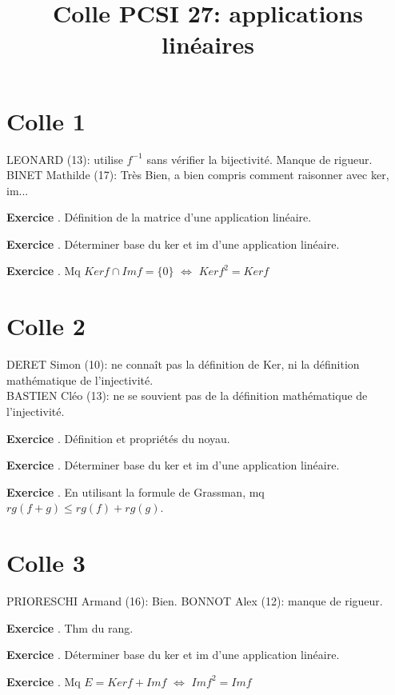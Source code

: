 \documentclass[10pt,a4paper]{article}
\title{Colle PCSI 27: applications linéaires}
\newcounter{question}
\newcounter{exo}
\newenvironment{exo}{\vspace{0.5cm}\setcounter{question}{0}\addtocounter{exo}{1} \noindent \textbf{Exercice \theexo}. \normalsize }{\par}
\begin{document}
	\maketitle
	
	\section*{Colle 1}

	\setcounter{exo}{0}
	LEONARD (13): utilise $f^{-1}$ sans vérifier la bijectivité. Manque de rigueur.
	BINET Mathilde (17): Très Bien, a bien compris comment raisonner avec ker, im...\\
	
	\begin{exo}
		Définition de la matrice d'une application linéaire.
	\end{exo}

	\begin{exo}
		Déterminer base du ker et im d'une application linéaire.
	\end{exo}	

	\begin{exo}
		Mq $Ker f \cap Im f = \lbrace 0 \rbrace$ $\Longleftrightarrow$ $Ker f^2 = Ker f$
	\end{exo}
	
	\section*{Colle 2}

	\setcounter{exo}{0}
	DERET Simon (10): ne connaît pas la définition de Ker, ni la définition mathématique de l'injectivité.\\
	BASTIEN Cléo (13): ne se souvient pas de la définition mathématique de l'injectivité.\\
	
	\begin{exo}
		Définition et propriétés du noyau.
	\end{exo}
		
	\begin{exo}
		Déterminer base du ker et im d'une application linéaire.		
	\end{exo}	
	
	\begin{exo}
		En utilisant la formule de Grassman, mq $rg(f + g) \leq rg(f) + rg(g)$.		
	\end{exo}
	
	\section*{Colle 3}
	\setcounter{exo}{0}
	PRIORESCHI Armand (16): Bien.
	BONNOT Alex (12): manque de rigueur.\\
	
	\begin{exo}
		Thm du rang.
	\end{exo}

	\begin{exo}
		Déterminer base du ker et im d'une application linéaire.
	\end{exo}	

	\begin{exo}
		Mq $E = Ker f + Im f$ $\Longleftrightarrow$ $Im f^2 = Im f$
	\end{exo}
\end{document}
